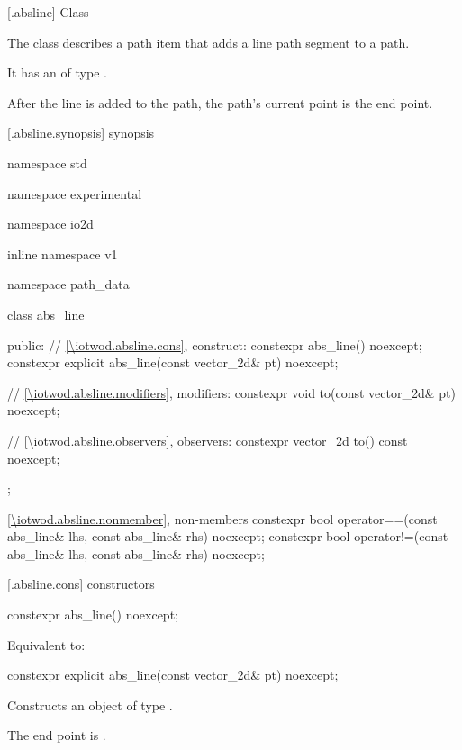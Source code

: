  [\iotwod.absline] {Class }%

\pnum
{}%
The class  describes a path item that adds a line path segment to a path.

\pnum
It has an  of type .

\pnum
After the line is added to the path, the path's current point is the end point.

 [\iotwod.absline.synopsis] { synopsis}%

\begin{codeblock}
namespace std { namespace experimental { namespace io2d { inline namespace v1 {
  namespace path_data {
    class abs_line {
    public:
      // \ref{\iotwod.absline.cons}, construct:
      constexpr abs_line() noexcept;
      constexpr explicit abs_line(const vector_2d& pt) noexcept;

      // \ref{\iotwod.absline.modifiers}, modifiers:
      constexpr void to(const vector_2d& pt) noexcept;

      // \ref{\iotwod.absline.observers}, observers:
      constexpr vector_2d to() const noexcept;
    };
    
    \ref{\iotwod.absline.nonmember}, non-members
    constexpr bool operator==(const abs_line& lhs, const abs_line& rhs) 
      noexcept;
    constexpr bool operator!=(const abs_line& lhs, const abs_line& rhs) 
      noexcept;
  }
} } } }
\end{codeblock}

 [\iotwod.absline.cons] { constructors}%

%
\begin{itemdecl}
constexpr abs_line() noexcept;
\end{itemdecl}
\begin{itemdescr}
\pnum
\effects
Equivalent to: 
\end{itemdescr}

%
\begin{itemdecl}
constexpr explicit abs_line(const vector_2d& pt) noexcept;
\end{itemdecl}
\begin{itemdescr}
\pnum
\effects
Constructs an object of type .

\pnum
The end point is .
\end{itemdescr}

